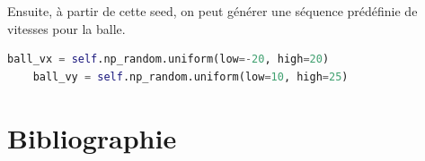 \documentclass[11pt, a4paper]{article}
\begin{document}
\noindent Ensuite, à partir de cette seed, on peut générer une séquence prédéfinie de vitesses pour la balle.

\begin{lstlisting}[language=python, frame=single, gobble=4, tabsize=4]	
	ball_vx = self.np_random.uniform(low=-20, high=20)
    ball_vy = self.np_random.uniform(low=10, high=25)
\end{lstlisting}




\section{Bibliographie}



\end{document}
